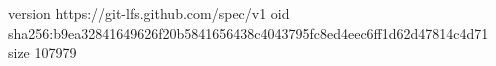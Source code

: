 version https://git-lfs.github.com/spec/v1
oid sha256:b9ea32841649626f20b5841656438c4043795fc8ed4eec6ff1d62d47814c4d71
size 107979
